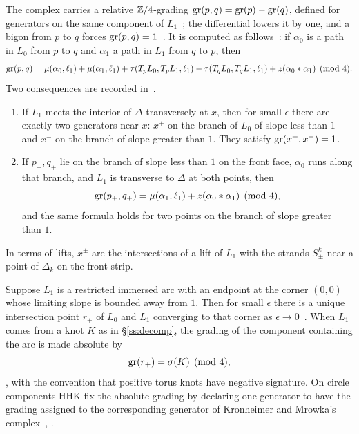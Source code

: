 The complex carries a relative $\mathbb{Z}/4$-grading $\operatorname{gr}(p,q)=\operatorname{gr}(p)-\operatorname{gr}(q)$, defined for generators on the same
component of $L_1$~\cite[Def.~3.7]{HHK2}; the differential lowers it by one, and a bigon from $p$ to $q$
forces $\operatorname{gr}(p,q)=1$~\cite[Prop.~3.8]{HHK2}. It is computed as follows~\cite[Lemma~3.10]{HHK2}: if
$\alpha_0$ is a path in $L_0$ from $p$ to $q$ and $\alpha_1$ a path in $L_1$ from $q$ to $p$, then
\begin{equation}\label{eq:grading15}
\operatorname{gr}(p,q)=\mu(\alpha_0,\ell_1)+\mu(\alpha_1,\ell_1)+\tau(T_pL_0,T_pL_1,\ell_1)-\tau(T_qL_0,T_qL_1,\ell_1)
+z(\alpha_0*\alpha_1)\pmod4 .
\end{equation}
Two consequences are recorded in~\cite[\S\S5.1--5.2]{HHK2}.
\begin{enumerate}
\item If $L_1$ meets the interior of $\Delta$ transversely at $x$, then for small $\epsilon$ there are exactly two
generators near $x$: $x^+$ on the branch of $L_0$ of slope less than $1$ and $x^-$ on the branch of slope
greater than $1$. They satisfy $\operatorname{gr}(x^+,x^-)=1$.
\item If $p_+,q_+$ lie on the branch of slope less than $1$ on the front face, $\alpha_0$ runs along that branch,
and $L_1$ is transverse to $\Delta$ at both points, then
\begin{equation}\label{eq:grading16}
\operatorname{gr}(p_+,q_+)=\mu(\alpha_1,\ell_1)+z(\alpha_0*\alpha_1)\pmod4 ,
\end{equation}
and the same formula holds for two points on the branch of slope greater than $1$.
\end{enumerate}
In terms of lifts, $x^\pm$ are the intersections of a lift of $L_1$ with the strands $S^k_\pm$ near a point
of $\Delta_k$ on the front strip.

Suppose $L_1$ is a restricted immersed arc with an endpoint at the corner $(0,0)$ whose limiting slope is
bounded away from $1$. Then for small $\epsilon$ there is a unique intersection point $r_+$ of $L_0$ and $L_1$
converging to that corner as $\epsilon\to0$~\cite[Lemma~5.1]{HHK2}. When $L_1$ comes from a knot $K$ as in
\S\ref{ss:decomp}, the grading of the component containing the arc is made absolute by
\begin{equation}\label{eq:grading19}
\operatorname{gr}(r_+)=\sigma(K)\pmod4 ,
\end{equation}
\cite[(19)]{HHK2}, with the convention that positive torus knots have negative signature. On circle
components HHK fix the absolute grading by declaring one generator to have the grading assigned to the
corresponding generator of Kronheimer and Mrowka's complex~\cite[\S6.1]{HHK2}, \cite[Prop.~4.4]{KM2}.

